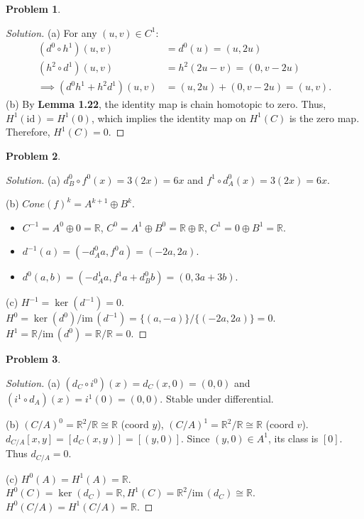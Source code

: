 \documentclass[12pt, a4paper]{article}
\theoremstyle{definition}
\newtheorem{problem}{Problem}
\newenvironment{solution}
  {\renewcommand\qedsymbol{$\blacksquare$}\begin{proof}[Solution]}
  {\end{proof}}
\newcommand{\R}{\mathbb{R}}
\newcommand{\im}{\text{im}\,}
\newcommand{\id}{\text{id}}
\begin{document}
\begin{problem}
\end{problem}

\begin{solution}
(a) For any $(u, v) \in C^1$:
\begin{align*}
    (d^0 \circ h^1)(u, v) &= d^0(u) = (u, 2u) \\
    (h^2 \circ d^1)(u, v) &= h^2(2u - v) = (0, v - 2u) \\
    \implies (d^0 h^1 + h^2 d^1)(u, v) &= (u, 2u) + (0, v - 2u) = (u, v).
\end{align*}
(b) By \textbf{Lemma 1.22}, the identity map is chain homotopic to zero. Thus, $H^1(\id) = H^1(0)$, which implies the identity map on $H^1(C)$ is the zero map. Therefore, $H^1(C) = 0$.
\end{solution}

\begin{problem}
\end{problem}

\begin{solution}
(a) $d_B^0 \circ f^0(x) = 3(2x) = 6x$ and $f^1 \circ d_A^0(x) = 3(2x) = 6x$.

(b) $Cone(f)^k = A^{k+1} \oplus B^k$.
\begin{itemize}[nosep]
    \item $C^{-1} = A^0 \oplus 0 = \R$, $C^0 = A^1 \oplus B^0 = \R \oplus \R$, $C^1 = 0 \oplus B^1 = \R$.
    \item $d^{-1}(a) = (-d_A^0 a, f^0 a) = (-2a, 2a)$.
    \item $d^0(a, b) = (-d_A^1 a, f^1 a + d_B^0 b) = (0, 3a + 3b)$.
\end{itemize}

(c) $H^{-1} = \ker(d^{-1}) = 0$. $H^0 = \ker(d^0)/\im(d^{-1}) = \{(a, -a)\}/\{(-2a, 2a)\} = 0$. $H^1 = \R/\im(d^0) = \R/\R = 0$.
\end{solution}

\begin{problem}
\end{problem}

\begin{solution}
(a) $(d_C \circ i^0)(x) = d_C(x, 0) = (0, 0)$ and $(i^1 \circ d_A)(x) = i^1(0) = (0, 0)$. Stable under differential.

(b) $(C/A)^0 = \R^2/\R \cong \R$ (coord $y$), $(C/A)^1 = \R^2/\R \cong \R$ (coord $v$).
$d_{C/A}[x, y] = [d_C(x, y)] = [(y, 0)]$. Since $(y, 0) \in A^1$, its class is $[0]$. Thus $d_{C/A} = 0$.

(c) $H^0(A) = H^1(A) = \R$. $H^0(C) = \ker(d_C) = \R, H^1(C) = \R^2/\im(d_C) \cong \R$. $H^0(C/A) = H^1(C/A) = \R$.
\end{solution}
\end{document}
